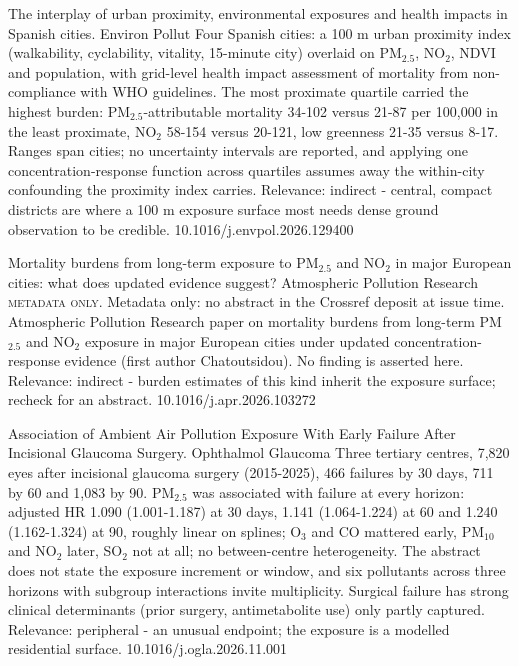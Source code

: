 \documentclass[10pt]{article}
\begin{document}
{The interplay of urban proximity, environmental exposures and health impacts in Spanish cities.}
{Environ Pollut}
{Four Spanish cities: a 100 m urban proximity index (walkability, cyclability, vitality, 15-minute city) overlaid on PM$_{2.5}$, NO$_2$, NDVI and population, with grid-level health impact assessment of mortality from non-compliance with WHO guidelines. The most proximate quartile carried the highest burden: PM$_{2.5}$-attributable mortality 34-102 versus 21-87 per 100,000 in the least proximate, NO$_2$ 58-154 versus 20-121, low greenness 21-35 versus 8-17. Ranges span cities; no uncertainty intervals are reported, and applying one concentration-response function across quartiles assumes away the within-city confounding the proximity index carries. Relevance: indirect - central, compact districts are where a 100 m exposure surface most needs dense ground observation to be credible.}
{10.1016/j.envpol.2026.129400}

{Mortality burdens from long-term exposure to PM$_{2.5}$ and NO$_2$ in major European cities: what does updated evidence suggest?}
{Atmospheric Pollution Research}
{\textsc{metadata only.} Metadata only: no abstract in the Crossref deposit at issue time. Atmospheric Pollution Research paper on mortality burdens from long-term PM$_{2.5}$ and NO$_2$ exposure in major European cities under updated concentration-response evidence (first author Chatoutsidou). No finding is asserted here. Relevance: indirect - burden estimates of this kind inherit the exposure surface; recheck for an abstract.}
{10.1016/j.apr.2026.103272}

\par{}\baselineskip{}\baselineskip
{}

{Association of Ambient Air Pollution Exposure With Early Failure After Incisional Glaucoma Surgery.}
{Ophthalmol Glaucoma}
{Three tertiary centres, 7,820 eyes after incisional glaucoma surgery (2015-2025), 466 failures by 30 days, 711 by 60 and 1,083 by 90. PM$_{2.5}$ was associated with failure at every horizon: adjusted HR 1.090 (1.001-1.187) at 30 days, 1.141 (1.064-1.224) at 60 and 1.240 (1.162-1.324) at 90, roughly linear on splines; O$_3$ and CO mattered early, PM$_{10}$ and NO$_2$ later, SO$_2$ not at all; no between-centre heterogeneity. The abstract does not state the exposure increment or window, and six pollutants across three horizons with subgroup interactions invite multiplicity. Surgical failure has strong clinical determinants (prior surgery, antimetabolite use) only partly captured. Relevance: peripheral - an unusual endpoint; the exposure is a modelled residential surface.}
{10.1016/j.ogla.2026.11.001}
\end{document}
